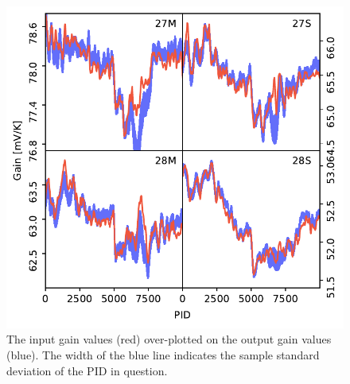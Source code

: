 \documentclass[twocolumn]{aa}%
\begin{document}
\begin{figure}[t]
    \begin{center}
        \includegraphics[width=\linewidth]{figs/simband_gain.pdf}
        \caption{The input gain values (red) over-plotted on the output gain values (blue). The width of the blue line indicates the sample standard deviation of the PID in question.}            \label{fig:band_gain}

    \end{center}



\end{figure}
\end{document}
